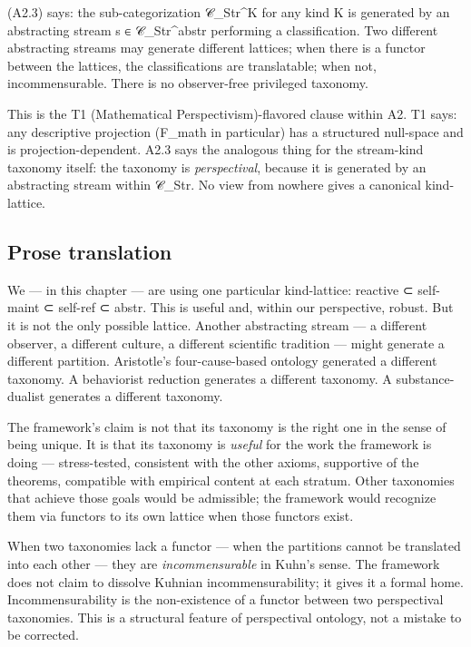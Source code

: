 \documentclass[11pt, openany]{book}
\begin{document}
(A2.3) says: the sub-categorization 𝒞\_\allowbreak{}Str\textasciicircum{}K for any kind K is generated by an abstracting stream s ∈ 𝒞\_\allowbreak{}Str\textasciicircum{}abstr performing a classification. Two different abstracting streams may generate different lattices; when there is a functor between the lattices, the classifications are translatable; when not, incommensurable. There is no observer-free privileged taxonomy.

This is the T1 (Mathematical Perspectivism)-flavored clause within A2. T1 says: any descriptive projection (F\_\allowbreak{}math in particular) has a structured null-space and is projection-dependent. A2.3 says the analogous thing for the stream-kind taxonomy itself: the taxonomy is \textit{perspectival}, because it is generated by an abstracting stream within 𝒞\_\allowbreak{}Str. No view from nowhere gives a canonical kind-lattice.

\subsection{Prose translation}

We --- in this chapter --- are using one particular kind-lattice: reactive ⊂ self-maint ⊂ self-ref ⊂ abstr. This is useful and, within our perspective, robust. But it is not the only possible lattice. Another abstracting stream --- a different observer, a different culture, a different scientific tradition --- might generate a different partition. Aristotle's four-cause-based ontology generated a different taxonomy. A behaviorist reduction generates a different taxonomy. A substance-dualist generates a different taxonomy.

The framework's claim is not that its taxonomy is the right one in the sense of being unique. It is that its taxonomy is \textit{useful} for the work the framework is doing --- stress-tested, consistent with the other axioms, supportive of the theorems, compatible with empirical content at each stratum. Other taxonomies that achieve those goals would be admissible; the framework would recognize them via functors to its own lattice when those functors exist.

When two taxonomies lack a functor --- when the partitions cannot be translated into each other --- they are \textit{incommensurable} in Kuhn's sense. The framework does not claim to dissolve Kuhnian incommensurability; it gives it a formal home. Incommensurability is the non-existence of a functor between two perspectival taxonomies. This is a structural feature of perspectival ontology, not a mistake to be corrected.
\end{document}

